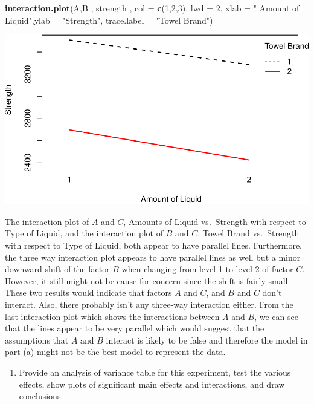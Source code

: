 \documentclass[12pt,]{article}
\newenvironment{Shaded}{\begin{snugshade}}{\end{snugshade}}
\newcommand{\KeywordTok}[1]{\textcolor[rgb]{0.13,0.29,0.53}{\textbf{#1}}}
\newcommand{\DataTypeTok}[1]{\textcolor[rgb]{0.13,0.29,0.53}{#1}}
\newcommand{\DecValTok}[1]{\textcolor[rgb]{0.00,0.00,0.81}{#1}}
\newcommand{\StringTok}[1]{\textcolor[rgb]{0.31,0.60,0.02}{#1}}
\newcommand{\NormalTok}[1]{#1}
\providecommand{\tightlist}{%
  \setlength{\itemsep}{0pt}\setlength{\parskip}{0pt}}
\begin{document}
\begin{Shaded}
\begin{Highlighting}[]
\KeywordTok{interaction.plot}\NormalTok{(A,B , strength , }\DataTypeTok{col =} \KeywordTok{c}\NormalTok{(}\DecValTok{1}\NormalTok{,}\DecValTok{2}\NormalTok{,}\DecValTok{3}\NormalTok{), }\DataTypeTok{lwd =} \DecValTok{2}\NormalTok{, }
                 \DataTypeTok{xlab =} \StringTok{" Amount of Liquid"}\NormalTok{,}\DataTypeTok{ylab =} \StringTok{"Strength"}\NormalTok{, }
                 \DataTypeTok{trace.label =} \StringTok{"Towel Brand"}\NormalTok{)}
\end{Highlighting}
\end{Shaded}

\includegraphics{Markdown_HW_7_files/figure-latex/unnamed-chunk-2-4.pdf}

The interaction plot of \(A\) and \(C\), Amounts of Liquid vs.~Strength
with respect to Type of Liquid, and the interaction plot of \(B\) and
\(C\), Towel Brand vs.~Strength with respect to Type of Liquid, both
appear to have parallel lines. Furthermore, the three way interaction
plot appears to have parallel lines as well but a minor downward shift
of the factor \(B\) when changing from level 1 to level 2 of factor
\(C\). However, it still might not be cause for concern since the shift
is fairly small. These two results would indicate that factors \(A\) and
\(C\), and \(B\) and \(C\) don't interact. Also, there probably isn't
any three-way interaction either. From the last interaction plot which
shows the interactions between \(A\) and \(B\), we can see that the
lines appear to be very parallel which would suggest that the
assumptions that \(A\) and \(B\) interact is likely to be false and
therefore the model in part (a) might not be the best model to represent
the data.

\begin{enumerate}
\def\labelenumi{(\alph{enumi})}
\setcounter{enumi}{3}
\tightlist
\item
  Provide an analysis of variance table for this experiment, test the
  various effects, show plots of significant main effects and
  interactions, and draw conclusions.
\end{enumerate}
\end{document}
